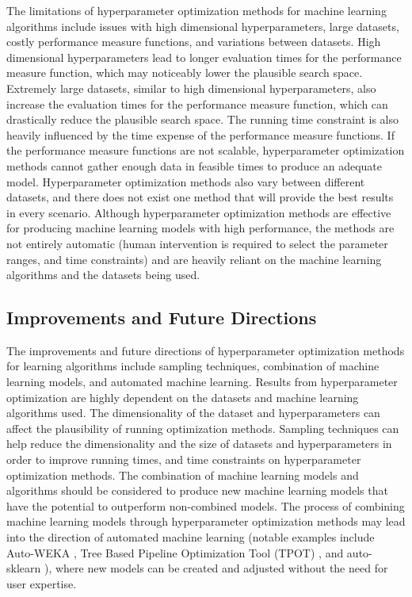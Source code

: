 The limitations of hyperparameter optimization methods for machine learning algorithms include issues with high dimensional hyperparameters, large datasets, costly performance measure functions, and variations between datasets. High dimensional hyperparameters lead to longer evaluation times for the performance measure function, which may noticeably lower the plausible search space. Extremely large datasets, similar to high dimensional hyperparameters, also increase the evaluation times for the performance measure function, which can drastically reduce the plausible search space. The running time constraint is also heavily influenced by the time expense of the performance measure functions. If the performance measure functions are not scalable, hyperparameter optimization methods cannot gather enough data in feasible times to produce an adequate model. Hyperparameter optimization methods also vary between different datasets, and there does not exist one method that will provide the best results in every scenario. Although hyperparameter optimization methods are effective for producing machine learning models with high performance, the methods are not entirely automatic (human intervention is required to select the parameter ranges, and time constraints) and are heavily reliant on the machine learning algorithms and the datasets being used.


\subsection{Improvements and Future Directions} \label{improvements-and-future-directions}

The improvements and future directions of hyperparameter optimization methods for learning algorithms include sampling techniques, combination of machine learning models, and automated machine learning. Results from hyperparameter optimization are highly dependent on the datasets and machine learning algorithms used. The dimensionality of the dataset and hyperparameters can affect the plausibility of running optimization methods. Sampling techniques can help reduce the dimensionality and the size of datasets and hyperparameters in order to improve running times, and time constraints on hyperparameter optimization methods. The combination of machine learning models and algorithms should be considered to produce new machine learning models that have the potential to outperform non-combined models. The process of combining machine learning models through hyperparameter optimization methods may lead into the direction of automated machine learning (notable examples include Auto-WEKA \cite{Thornton:2013}, Tree Based Pipeline Optimization Tool (TPOT) \cite{Olson:2016}, and auto-sklearn \cite{Feurer:2015}), where new models can be created and adjusted without the need for user expertise.


